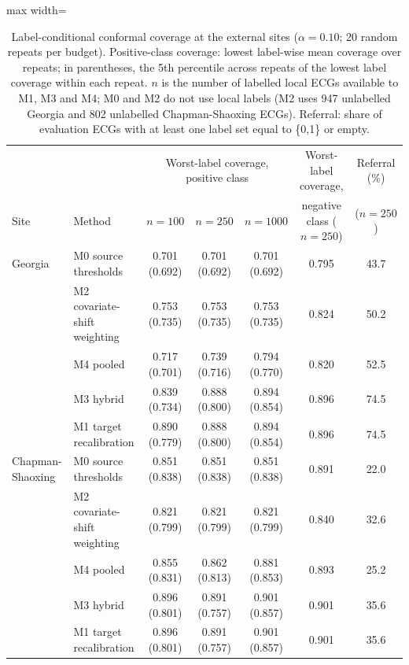\begin{table}[!htbp]
\centering\small
\caption{Label-conditional conformal coverage at the external sites ($\alpha=0.10$; 20 random repeats per budget). Positive-class coverage: lowest label-wise mean coverage over repeats; in parentheses, the 5th percentile across repeats of the lowest label coverage within each repeat. $n$ is the number of labelled local ECGs available to M1, M3 and M4; M0 and M2 do not use local labels (M2 uses 947 unlabelled Georgia and 802 unlabelled Chapman-Shaoxing ECGs). Referral: share of evaluation ECGs with at least one label set equal to \{0,1\} or empty.}
\label{tab:external}
\setlength{\tabcolsep}{4pt}
\begin{adjustbox}{max width=\linewidth}
\begin{tabular}{llccccc}
\toprule
 & & \multicolumn{3}{c}{Worst-label coverage, positive class} & Worst-label coverage, & Referral (\%) \\
Site & Method & $n=100$ & $n=250$ & $n=1000$ & negative class ($n=250$) & ($n=250$) \\
\midrule
Georgia & M0 source thresholds & 0.701 (0.692) & 0.701 (0.692) & 0.701 (0.692) & 0.795 & 43.7 \\
 & M2 covariate-shift weighting & 0.753 (0.735) & 0.753 (0.735) & 0.753 (0.735) & 0.824 & 50.2 \\
 & M4 pooled & 0.717 (0.701) & 0.739 (0.716) & 0.794 (0.770) & 0.820 & 52.5 \\
 & M3 hybrid & 0.839 (0.734) & 0.888 (0.800) & 0.894 (0.854) & 0.896 & 74.5 \\
 & M1 target recalibration & 0.890 (0.779) & 0.888 (0.800) & 0.894 (0.854) & 0.896 & 74.5 \\
\midrule
Chapman-Shaoxing & M0 source thresholds & 0.851 (0.838) & 0.851 (0.838) & 0.851 (0.838) & 0.891 & 22.0 \\
 & M2 covariate-shift weighting & 0.821 (0.799) & 0.821 (0.799) & 0.821 (0.799) & 0.840 & 32.6 \\
 & M4 pooled & 0.855 (0.831) & 0.862 (0.813) & 0.881 (0.853) & 0.893 & 25.2 \\
 & M3 hybrid & 0.896 (0.801) & 0.891 (0.757) & 0.901 (0.857) & 0.901 & 35.6 \\
 & M1 target recalibration & 0.896 (0.801) & 0.891 (0.757) & 0.901 (0.857) & 0.901 & 35.6 \\
\bottomrule
\end{tabular}
\end{adjustbox}
\end{table}
